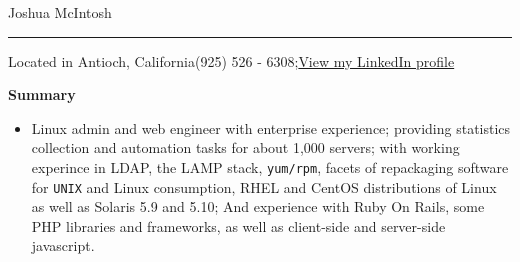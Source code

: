 \documentclass[11pt,oneside]{article}
\newcommand{\name}{Joshua McIntosh}
\newcommand{\addr}{Antioch, California}
\newcommand{\phone}{(925) 526 - 6308}
\newcommand{\email}{\href{http://www.linkedin.com/pub/joshua-mcintosh/57/b82/690}
{View my LinkedIn profile}}
\newcommand{\bigname}[1]{
		\begin{center}\huge{\myname #1}\end{center}
}
\newenvironment{ressection}[1]{
	\vspace{4pt}
	{\textbf{\LARGE {\bigtxt #1}}}
	\begin{itemize}
	\vspace{2pt}
}{
	\end{itemize}
}
\begin{document}

\bigname{\name}

\vspace{-8pt} \rule{\textwidth}{.25pt}
\textsf{Located in \addr}\hfill \phone;\hspace{4pt}\email


\vspace{8 pt}

\begin{ressection}{Summary}
\item Linux admin and web engineer with enterprise experience; providing 
	statistics collection and automation tasks for about 1,000 servers; with
	working experince in LDAP, the LAMP stack, \texttt{yum/rpm}, facets of 
	repackaging software for \texttt{UNIX} and Linux consumption, RHEL and 
	CentOS distributions of Linux as well as Solaris 5.9 and 5.10; And 
	experience with Ruby On Rails, some PHP libraries and frameworks, as well as
	client-side and server-side javascript.
\end{ressection}
 
\end{document}
